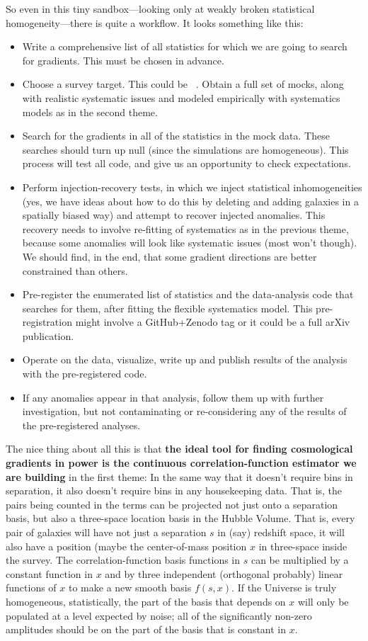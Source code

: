 \documentclass[12pt, fullpage, letterpaper]{article}
\begin{document}
So even in this tiny sandbox---looking only at weakly broken
statistical homogeneity---there is quite a workflow. It looks
something like this:
\begin{itemize}
\item
Write a comprehensive list of all statistics for which we are going to search
for gradients. This must be chosen in advance.
\item
Choose a survey target. This could be
\SDSSIV\ . Obtain a full set of mocks, along
with realistic systematic issues and modeled empirically with
systematics models as in the second theme.
\item
Search for the gradients in all of the statistics in the mock
data. These searches should turn up null (since the simulations are
homogeneous). This process will test all code, and give us an
opportunity to check expectations.
\item
Perform injection-recovery tests, in which we inject statistical inhomogeneities
(yes, we have ideas about how to do this by deleting and adding galaxies in a
spatially biased way) and attempt to recover injected anomalies.
This recovery needs to involve re-fitting of systematics as in the previous
theme, because some anomalies will look like systematic issues (most won't though).
We should find, in the end, that some gradient directions are better constrained than others.
\item
Pre-register the enumerated list of statistics and the data-analysis code that
searches for them, after fitting the flexible systematics model.
This pre-registration might involve a GitHub+Zenodo tag or it could be
a full arXiv publication.
\item
Operate on the data, visualize, write up and publish results of the
analysis with the pre-registered code.
\item
If any anomalies appear in that analysis, follow them up with further
investigation, but not contaminating or re-considering any of the results
of the pre-registered analyses.
\end{itemize}

The nice thing about all this is that \textbf{the ideal tool for
  finding cosmological gradients in power is the continuous
  correlation-function estimator we are building} in the first theme:
In the same way that it doesn't require bins in separation, it also
doesn't require bins in any housekeeping data. That is, the pairs
being counted in the terms can be projected not just onto a separation
basis, but also a three-space location basis in the Hubble
Volume. That is, every pair of galaxies will have not just a
separation $s$ in (say) redshift space, it will also have a position
(maybe the center-of-mass position $x$ in three-space inside the
survey.  The correlation-function basis functions in $s$ can be
multiplied by a constant function in $x$ and by three independent (orthogonal
probably) linear functions of
$x$ to make a new smooth basis $f(s,x)$. If the Universe is truly
homogeneous, statistically, the part of the basis that depends on $x$
will only be populated at a level expected by noise; all of the
significantly non-zero amplitudes should be on the part of the basis
that is constant in $x$.
\end{document}
